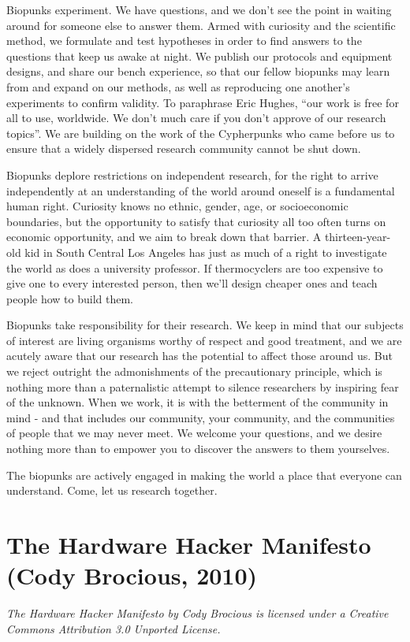 \documentclass[letterpaper,12pt,english]{sphinxmanual}
\begin{document}
Biopunks experiment. We have questions, and we don't see the point in waiting around for someone else to answer them. Armed with curiosity and the scientific method, we formulate and test hypotheses in order to find answers to the questions that keep us awake at night. We publish our protocols and equipment designs, and share our bench experience, so that our fellow biopunks may learn from and expand on our methods, as well as reproducing one another's experiments to confirm validity. To paraphrase Eric Hughes, ``our work is free for all to use, worldwide. We don't much care if you don't approve of our research topics''. We are building on the work of the Cypherpunks who came before us to ensure that a widely dispersed research community cannot be shut down.

Biopunks deplore restrictions on independent research, for the right to arrive independently at an understanding of the world around oneself is a fundamental human right. Curiosity knows no ethnic, gender, age, or socioeconomic boundaries, but the opportunity to satisfy that curiosity all too often turns on economic opportunity, and we aim to break down that barrier. A thirteen-year-old kid in South Central Los Angeles has just as much of a right to investigate the world as does a university professor. If thermocyclers are too expensive to give one to every interested person, then we'll design cheaper ones and teach people how to build them.

Biopunks take responsibility for their research. We keep in mind that our subjects of interest are living organisms worthy of respect and good treatment, and we are acutely aware that our research has the potential to affect those around us. But we reject outright the admonishments of the precautionary principle, which is nothing more than a paternalistic attempt to silence researchers by inspiring fear of the unknown. When we work, it is with the betterment of the community in mind - and that includes our community, your community, and the communities of people that we may never meet. We welcome your questions, and we desire nothing more than to empower you to discover the answers to them yourselves.

The biopunks are actively engaged in making the world a place that everyone can understand. Come, let us research together.


\chapter{The Hardware Hacker Manifesto (Cody Brocious, 2010)}
\label{hardware-hacker::doc}\label{hardware-hacker:the-hardware-hacker-manifesto-cody-brocious-2010}\label{hardware-hacker:index-0}
\emph{The Hardware Hacker Manifesto by Cody Brocious is licensed under a Creative Commons Attribution 3.0 Unported License.}
\end{document}
